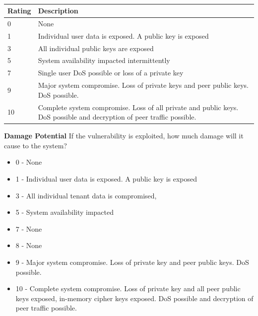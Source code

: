 \documentclass [11pt, proquest] {uwthesis}[2020/02/24]
\begin{document}
\begin{table}[H]
\label{Damage Potential}
\\
\begin{tabular}{|m{1.5cm}|p{15cm} |}

\hline
Rating & Description \\
\hline
0 &  None            \\
\hline
1 &  Individual user data is exposed. A public key is exposed \\
\hline
3 &  All individual public keys are exposed         \\
\hline
5 &  System availability impacted intermittently          \\
\hline
7 &  Single user DoS possible or loss of a private key  \\
\hline
9 &  Major system compromise. Loss of private keys and peer public keys. DoS possible. \\
\hline
10 & Complete system compromise. Loss of all private and public keys. DoS possible and decryption of peer traffic possible.\\
\hline
\end{tabular}

\end{table}

\textbf{Damage Potential}
If the vulnerability is exploited, how much damage will it cause to the system?
\begin{itemize}
\label{dread:damage}
	\item 0 - None
    \item 1 - Individual user data is exposed. A public key is exposed
    \item 3 - All individual tenant data is compromised, 
    \item 5 - System availability impacted
    \item 7 - None
    \item 8 - None
    \item 9 - Major system compromise. Loss of private key and peer public keys. DoS possible.
    \item 10 - Complete system compromise. Loss of private key and all peer public keys exposed, in-memory cipher keys exposed. DoS possible and decryption of peer traffic possible.
\end{itemize}
\medskip
\end{document}
